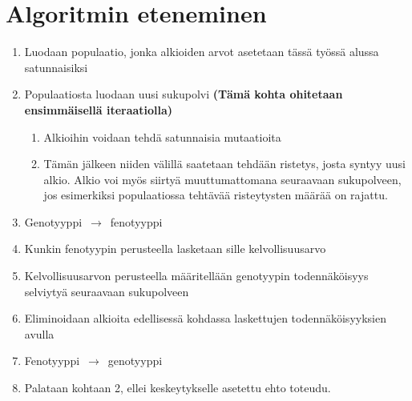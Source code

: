 \section{Algoritmin eteneminen}

\begin{enumerate}
	\item Luodaan populaatio, jonka alkioiden arvot asetetaan tässä työssä alussa satunnaisiksi
	\item Populaatiosta luodaan uusi sukupolvi \textbf{(Tämä kohta ohitetaan ensimmäisellä iteraatiolla)}
	\begin{enumerate}
		\item Alkioihin voidaan tehdä satunnaisia mutaatioita
		\item Tämän jälkeen niiden välillä saatetaan tehdään ristetys, josta syntyy uusi alkio.
		Alkio voi myös siirtyä muuttumattomana seuraavaan sukupolveen, jos esimerkiksi
		populaatiossa tehtävää risteytysten määrää on rajattu.
	\end{enumerate}
	\item Genotyyppi~\(\rightarrow\)~fenotyyppi
	\item	Kunkin fenotyypin perusteella lasketaan sille kelvollisuusarvo
	\item Kelvollisuusarvon perusteella määritellään genotyypin todennäköisyys selviytyä seuraavaan sukupolveen
	\item Eliminoidaan alkioita edellisessä kohdassa laskettujen todennäköisyyksien avulla
	\item Fenotyyppi~\(\rightarrow\)~genotyyppi
	\item Palataan kohtaan 2, ellei keskeytykselle asetettu ehto toteudu.
\end{enumerate}
